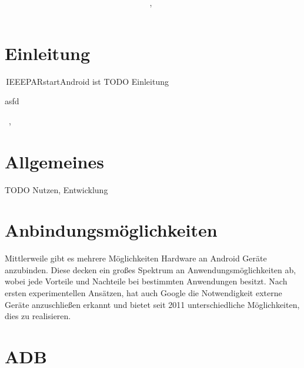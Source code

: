 \documentclass[12pt,journal,compsoc]{IEEEtran}
\begin{document}
\title{\paperTitle \\ \paperSubTitle }
\author{\paperAuthor,~}%



\maketitle

\section{Einleitung}


\,IEEEPARstart{A}{}ndroid ist 
TODO Einleitung 

\cite{buch}asfd



\hfill{\the\day~\Monat, \the\year  }

\section{Allgemeines}
TODO Nutzen, Entwicklung

\section{Anbindungsmöglichkeiten}
Mittlerweile gibt es mehrere Möglichkeiten Hardware an Android Geräte anzubinden. 
Diese decken ein großes Spektrum an Anwendungsmöglichkeiten ab, wobei jede Vorteile und Nachteile bei bestimmten Anwendungen besitzt.
Nach ersten experimentellen Ansätzen, hat auch Google die Notwendigkeit externe Geräte anzuschließen
erkannt und bietet seit 2011 unterschiedliche Möglichkeiten, dies zu realisieren. 

\section{ADB}
\end{document}
